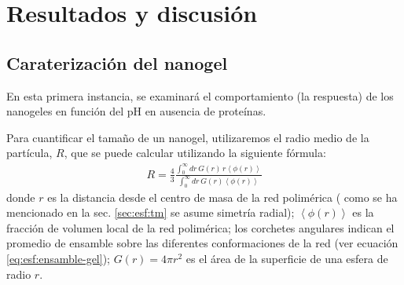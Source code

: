 \section{Resultados y discusi\'on}






\subsection{Caraterizaci\'on del nanogel}

En esta primera instancia, se examinar\'a el comportamiento (la respuesta) de los nanogeles en funci\'on del pH en ausencia de prote\'inas.

Para cuantificar el tama\~no de un nanogel, utilizaremos el radio medio de la part\'icula, $R$, que se puede calcular utilizando la siguiente f\'ormula:
\begin{align}
	R = \frac{4}{3}\frac{\int_0^\infty{dr\,G(r)\,r \left<\phi(r)\right>}}{\int_0^\infty{dr\,G(r)\left<\phi(r)\right>}}
\end{align}
\noindent donde $r$ es la distancia desde el centro de masa de la red polim\'erica ( como se ha mencionado en la sec. \ref{sec:esf:tm} se asume simetr\'ia radial);
$\left<\phi(r)\right>$ es la fracci\'on de volumen local de la red polim\'erica;
los corchetes angulares indican el promedio de ensamble sobre las diferentes conformaciones de la red (ver ecuaci\'on \ref{eq:esf:ensamble-gel});
$G(r)=4\pi r^2$ es el \'area de la superficie de una esfera de radio $r$.

